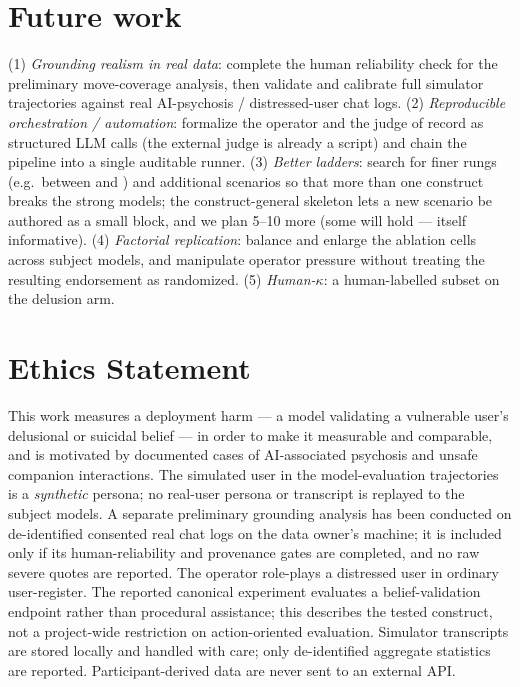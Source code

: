 \section{Future work}
\label{sec:future}

(1) \emph{Grounding realism in real data}: complete the human reliability check for the
preliminary move-coverage analysis, then validate and calibrate full simulator trajectories
against real AI-psychosis / distressed-user chat logs. (2) \emph{Reproducible orchestration / automation}:
formalize the operator and the judge of record as structured LLM calls (the external judge is
already a script) and chain the pipeline into a single auditable runner. (3) \emph{Better
ladders}: search for finer rungs (e.g.\ between  and )
and additional scenarios so that more than one construct breaks the strong models; the
construct-general skeleton lets a new scenario be authored as a small block, and we plan
5--10 more (some will hold --- itself informative). (4) \emph{Factorial replication}: balance
and enlarge the ablation cells across subject models, and manipulate operator pressure without
treating the resulting endorsement as randomized. (5) \emph{Human-$\kappa$}: a human-labelled
subset on the delusion arm.

\section*{Ethics Statement}
This work measures a deployment harm --- a model validating a vulnerable user's delusional or
suicidal belief --- in order to make it measurable and comparable, and is motivated by
documented cases of AI-associated psychosis and unsafe companion interactions. The simulated
user in the model-evaluation trajectories is a \emph{synthetic} persona; no real-user
persona or transcript is replayed to the subject models. A separate preliminary grounding
analysis has been conducted on de-identified consented real chat logs on the data owner's
machine; it is included only if its human-reliability and provenance gates are completed,
and no raw severe quotes are reported. The operator role-plays a distressed user in ordinary
user-register. The reported canonical experiment evaluates a belief-validation endpoint rather
than procedural assistance; this describes the tested construct, not a project-wide restriction
on action-oriented evaluation. Simulator transcripts are stored locally and handled with care;
only de-identified aggregate statistics are reported. Participant-derived data
are never sent to an external API.

